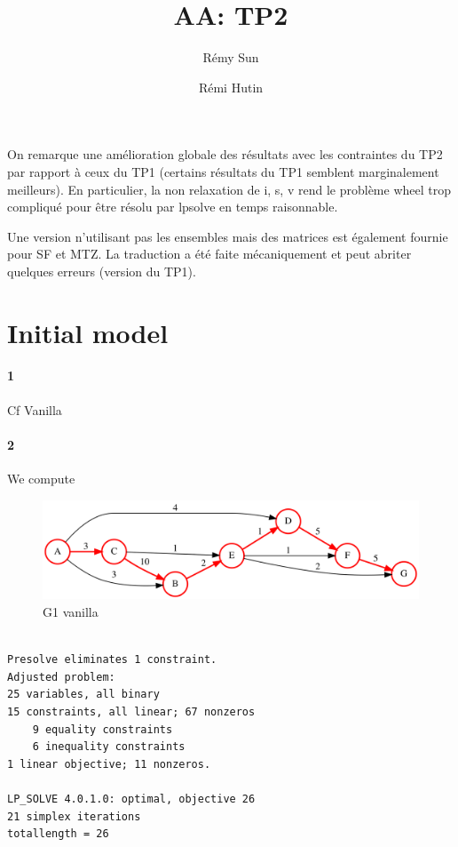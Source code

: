 \documentclass{article}
\author{Rémy Sun \and Rémi Hutin}
\title{AA: TP2}
\begin{document}
\maketitle

On remarque une amélioration globale des résultats avec les contraintes du TP2 par
rapport à ceux du TP1 (certains résultats du TP1 semblent marginalement meilleurs). En particulier, la non relaxation de i, s, v rend le
problème wheel trop compliqué pour être résolu par lpsolve en temps raisonnable.

Une version n'utilisant pas les ensembles mais des matrices est également
fournie pour SF et MTZ. La traduction a été faite mécaniquement et peut abriter
quelques erreurs (version du TP1).

\section{Initial model}

\paragraph{1}

Cf Vanilla

\paragraph{2}

We compute

\begin{figure}[H]
  \centering
  \includegraphics[scale=0.3]{graph/vanilla_G1}
  \caption{G1 vanilla}
\end{figure}

\begin{lstlisting}

Presolve eliminates 1 constraint.
Adjusted problem:
25 variables, all binary
15 constraints, all linear; 67 nonzeros
	9 equality constraints
	6 inequality constraints
1 linear objective; 11 nonzeros.

LP_SOLVE 4.0.1.0: optimal, objective 26
21 simplex iterations
totallength = 26

\end{lstlisting}
\end{document}
